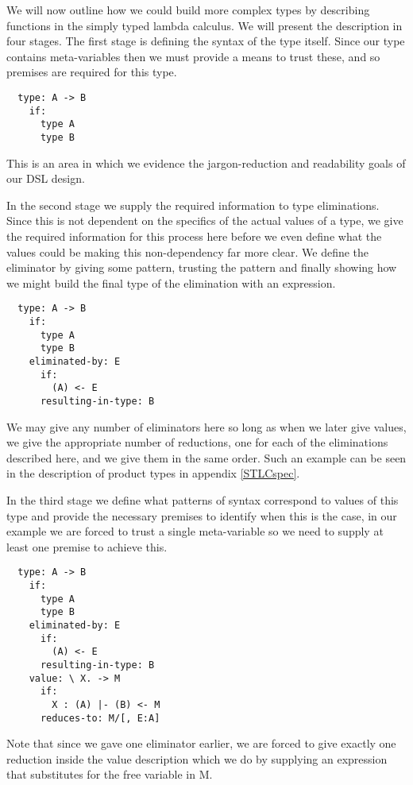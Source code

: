 We will now outline how we could build more complex types by
describing functions in the simply typed lambda calculus. We will
present the description in four stages. The first stage is defining
the syntax of the type itself. Since our type contains meta-variables
then we must provide a means to trust these, and so premises are
required for this type.

\begin{BVerbatim}
  type: A -> B
    if:
      type A
      type B
\end{BVerbatim}

This is an area in which we evidence the jargon-reduction and
readability goals of our DSL design.

In the second stage we supply the required information to type
eliminations. Since this is not dependent on the specifics of the
actual values of a type, we give the required information for this
process here before we even define what the values could be making
this non-dependency far more clear. We define the eliminator by giving
some pattern, trusting the pattern and finally showing how we might
build the final type of the elimination with an expression.

\begin{BVerbatim}
  type: A -> B
    if:
      type A
      type B
    eliminated-by: E
      if:
        (A) <- E
      resulting-in-type: B
\end{BVerbatim}

We may give any number of eliminators here so long as when we later
give values, we give the appropriate number of reductions, one for
each of the eliminations described here, and we give them in the same
order. Such an example can be seen in the description of product types
in appendix \ref{STLCspec}.

In the third stage we define what patterns of syntax correspond to
values of this type and provide the necessary premises to identify
when this is the case, in our example we are forced to trust a single
meta-variable so we need to supply at least one premise to achieve
this.

\begin{BVerbatim}
  type: A -> B
    if:
      type A
      type B
    eliminated-by: E
      if:
        (A) <- E
      resulting-in-type: B
    value: \ X. -> M
      if:
        X : (A) |- (B) <- M
      reduces-to: M/[, E:A]
\end{BVerbatim}

Note that since we gave one eliminator earlier, we are forced to give
exactly one reduction inside the value description which we do by
supplying an expression that substitutes for the free variable in M.

